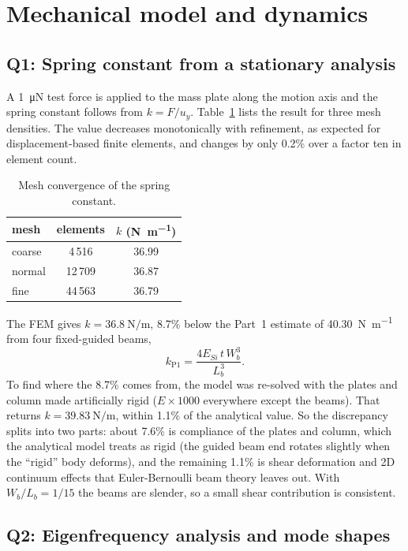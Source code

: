 \section{Mechanical model and dynamics}

\subsection*{Q1: Spring constant from a stationary analysis}

A \SI{1}{\micro\newton} test force is applied to the mass plate along the
motion axis and the spring constant follows from $k=F/u_{y}$.
Table~\ref{tab:q1conv} lists the result for three mesh densities. The value
decreases monotonically with refinement, as expected for displacement-based
finite elements, and changes by only 0.2\% over a factor ten in element
count.

\begin{table}[H]
\centering
\small
\caption{Mesh convergence of the spring constant.}
\label{tab:q1conv}
\begin{tabular}{lcc}
\toprule
mesh & elements & $k$ (\si{\newton\per\meter})\\
\midrule
coarse & 4\,516  & 36.99\\
normal & 12\,709 & 36.87\\
fine   & 44\,563 & 36.79\\
\bottomrule
\end{tabular}
\end{table}

The FEM gives $k=\SI{36.8}{\newton\per\meter}$, 8.7\% below the Part~1
estimate of \SI{40.30}{\newton\per\meter} from four fixed-guided beams,
\begin{equation}
  k_{\mathrm{P1}} = \frac{4E_{Si}\,t\,W_{b}^{3}}{L_{b}^{3}}.
\end{equation}
To find where the 8.7\% comes from, the model was re-solved with the plates
and column made artificially rigid ($E\times1000$ everywhere except the
beams). That returns $k=\SI{39.83}{\newton\per\meter}$, within 1.1\% of the
analytical value. So the discrepancy splits into two parts: about 7.6\% is
compliance of the plates and column, which the analytical model treats as
rigid (the guided beam end rotates slightly when the ``rigid'' body deforms),
and the remaining 1.1\% is shear deformation and 2D continuum effects that
Euler-Bernoulli beam theory leaves out. With $W_{b}/L_{b}=1/15$ the beams
are slender, so a small shear contribution is consistent.

\subsection*{Q2: Eigenfrequency analysis and mode shapes}

